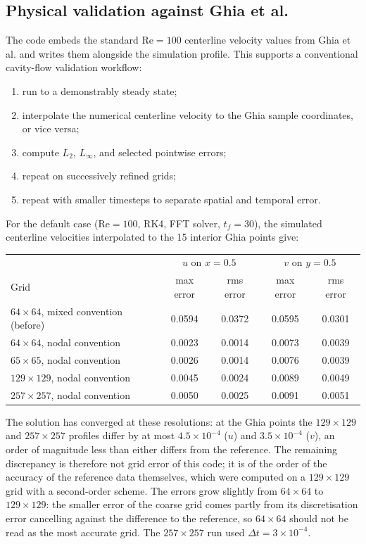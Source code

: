 \documentclass[11pt,a4paper]{article}
\newcommand{\Rey}{\mathrm{Re}}
\newcommand{\dt}{\Delta t}
\begin{document}
\subsection{Physical validation against Ghia et al.}
\label{sec:ghia}

The code embeds the standard $\Rey=100$ centerline velocity values from Ghia et al. \cite{ghia1982} and writes them alongside the simulation profile.  This supports a conventional cavity-flow validation workflow:
\begin{enumerate}[leftmargin=2em]
  \item run to a demonstrably steady state;
  \item interpolate the numerical centerline velocity to the Ghia sample coordinates, or vice versa;
  \item compute $L_2$, $L_\infty$, and selected pointwise errors;
  \item repeat on successively refined grids;
  \item repeat with smaller timesteps to separate spatial and temporal error.
\end{enumerate}

For the default case ($\Rey=100$, RK4, FFT solver, $t_f=30$), the simulated centerline velocities interpolated to the 15 interior Ghia points give:

\begin{center}
\begin{tabular}{lcccc}
\toprule
 & \multicolumn{2}{c}{$u$ on $x=0.5$} & \multicolumn{2}{c}{$v$ on $y=0.5$} \\
Grid & max error & rms error & max error & rms error \\
\midrule
$64\times64$, mixed convention (before) & 0.0594 & 0.0372 & 0.0595 & 0.0301 \\
$64\times64$, nodal convention & 0.0023 & 0.0014 & 0.0073 & 0.0039 \\
$65\times65$, nodal convention & 0.0026 & 0.0014 & 0.0076 & 0.0039 \\
$129\times129$, nodal convention & 0.0045 & 0.0024 & 0.0089 & 0.0049 \\
$257\times257$, nodal convention & 0.0050 & 0.0025 & 0.0091 & 0.0051 \\
\bottomrule
\end{tabular}
\end{center}

The solution has converged at these resolutions: at the Ghia points the $129\times129$ and $257\times257$ profiles differ by at most $4.5\times10^{-4}$ ($u$) and $3.5\times10^{-4}$ ($v$), an order of magnitude less than either differs from the reference.  The remaining discrepancy is therefore not grid error of this code; it is of the order of the accuracy of the reference data themselves, which were computed on a $129\times129$ grid with a second-order scheme.  The errors grow slightly from $64\times64$ to $129\times129$: the smaller error of the coarse grid comes partly from its discretisation error cancelling against the difference to the reference, so $64\times64$ should not be read as the most accurate grid.  The $257\times257$ run used $\dt=3\times10^{-4}$.
\end{document}
